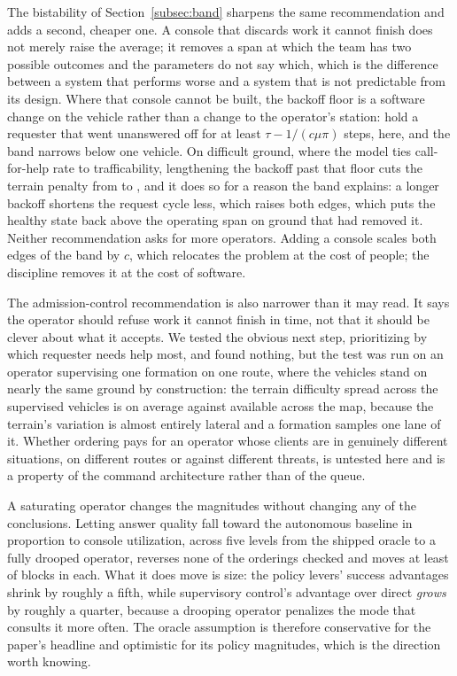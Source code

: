 \documentclass[11pt]{article}
\begin{document}
The bistability of Section~\ref{subsec:band} sharpens the same recommendation and adds a
second, cheaper one. A console that discards work it cannot finish does not merely raise the average;
it removes a span at which the team has two possible outcomes and the parameters do not say which,
which is the difference between a system that performs worse and a system that is not predictable
from its design. Where that console cannot be built, the backoff floor is a software change on the
vehicle rather than a change to the operator's station: hold a requester that went unanswered off
for at least $\tau - 1/(c\mu\pi)$ steps, \qBandFloor{} here, and the band narrows below one vehicle.
On difficult ground, where the model ties call-for-help rate to trafficability, lengthening the backoff past that floor cuts the terrain penalty from \qDefileShort{} to \qDefileLong{}, and it does so for a reason the band explains: a longer backoff shortens the request cycle less, which raises both edges, which puts the healthy state back above the operating span on ground that had removed it. Neither
recommendation asks for more operators. Adding a console scales both edges of the band by $c$, which
relocates the problem at the cost of people; the discipline removes it at the cost of software.

The admission-control recommendation is also narrower than it may read. It says the operator should refuse work it cannot finish in time, not that it should be clever about what it accepts. We tested the obvious next step, prioritizing by which requester needs help most, and found nothing, but the test was run on an operator supervising one formation on one route, where the vehicles stand on nearly the same ground by construction: the terrain difficulty spread across the supervised vehicles is \qTriageSeen{} on average against \qTriageMap{} available across the map, because the terrain's variation is almost entirely lateral and a formation samples one lane of it. Whether ordering pays for an operator whose clients are in genuinely different situations, on different routes or against different threats, is untested here and is a property of the command architecture rather than of the queue.

A saturating operator changes the magnitudes without changing any of the conclusions. Letting answer quality fall toward the autonomous baseline in proportion to console utilization, across five levels from the shipped oracle to a fully drooped operator, reverses none of the \drChecked{} orderings checked and moves at least \drBlocks{} of \drBlocks{} blocks in each. What it does move is size: the policy levers' success advantages shrink by roughly a fifth, while supervisory control's advantage over direct \emph{grows} by roughly a quarter, because a drooping operator penalizes the mode that consults it more often. The oracle assumption is therefore conservative for the paper's headline and optimistic for its policy magnitudes, which is the direction worth knowing.
\end{document}
